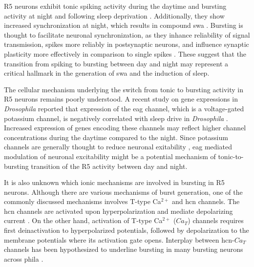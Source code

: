 \documentclass[../main.tex]{subfiles}
\begin{document}
R5 neurons exhibit tonic spiking activity during the daytime and bursting activity at night and following sleep deprivation \parencite{liuSleepDriveEncoded2016,raccugliaNetworkSpecificSynchronizationElectrical2019}. Additionally, they show increased synchronization at night, which results in compound \gls{swa} \parencite{raccugliaNetworkSpecificSynchronizationElectrical2019}. Bursting is thought to facilitate neuronal synchronization, as they inhance reliability of signal transmission, spikes more reliably in postsynaptic neurons, and influence synaptic plasticity more effectively in comparison to single spikes \parencite{lismanBurstsUnitNeural1997,kimBurstSynchronizationScalefree2019}.
These suggest that the transition from spiking to bursting between day and night may represent a critical hallmark in the generation of \gls{swa} and the induction of sleep.

The cellular mechanism underlying the switch from tonic to bursting activity in R5 neurons remains poorly understood. A recent study on gene expressions in \textit{Drosophila} reported that expression of the \gls{eag} channel, which is a voltage-gated potassium channel, is negatively correlated with sleep drive in \textit{Drosophila} \parencite{doppSinglecellTranscriptomicsReveals2024}.
Increased expression of genes encoding these channels may reflect higher channel concentrations during the daytime compared to the night. Since potassium channels are generally thought to reduce neuronal exitability \parencite{bruggemannEtheragogoEncodesVoltagegated1993}, \gls{eag} mediated modulation of neuronal excitability might be a potential mechanism of tonic-to-bursting transition of the R5 activity between day and night.

It is also unknown which ionic mechanisms are involved in bursting in R5 neurons. Although there are various mechanisms of burst generation, one of the commonly discussed mechanisms involves T-type Ca$^{2+}$ and \gls{hcn} channels. The \gls{hcn} channels are activated upon hyperpolarization and mediate depolarizing current \parencite{destexheModelInwardCurrent1993}. On the other hand, activation of T-type Ca$^{2+}$ ($Ca_T$) channels requires first deinactivation to hyperpolarized potentials, followed by depolarization to the membrane potentials where its activation gate opens. Interplay between \gls{hcn}-$Ca_T$ channels has been hypothesized to underline bursting in many bursting neurons across phila \parencite{wangMultipleDynamicalModes1994,liuMultipleConductancesCooperatively2008}.
\end{document}
